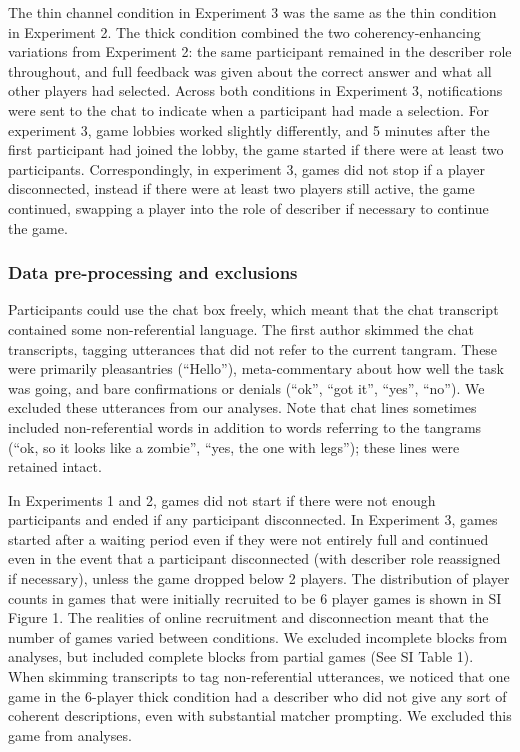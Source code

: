 \documentclass[
  english,
]{article}
\begin{document}
The thin channel condition in Experiment 3 was the same as the thin condition in Experiment 2.
The thick condition combined the two coherency-enhancing variations from Experiment 2: the same participant remained in the describer role throughout, and full feedback was given about the correct answer and what all other players had selected.
Across both conditions in Experiment 3, notifications were sent to the chat to indicate when a participant had made a selection.
For experiment 3, game lobbies worked slightly differently, and 5 minutes after the first participant had joined the lobby, the game started if there were at least two participants. Correspondingly, in experiment 3, games did not stop if a player disconnected, instead if there were at least two players still active, the game continued, swapping a player into the role of describer if necessary to continue the game.

\hypertarget{data-pre-processing-and-exclusions}{%
\subsubsection{Data pre-processing and exclusions}\label{data-pre-processing-and-exclusions}}

Participants could use the chat box freely, which meant that the chat transcript contained some non-referential language. The first author skimmed the chat transcripts, tagging utterances that did not refer to the current tangram. These were primarily pleasantries (``Hello''), meta-commentary about how well the task was going, and bare confirmations or denials (``ok'', ``got it'', ``yes'', ``no''). We excluded these utterances from our analyses. Note that chat lines sometimes included non-referential words in addition to words referring to the tangrams (``ok, so it looks like a zombie'', ``yes, the one with legs''); these lines were retained intact.

In Experiments 1 and 2, games did not start if there were not enough participants and ended if any participant disconnected.
In Experiment 3, games started after a waiting period even if they were not entirely full and continued even in the event that a participant disconnected (with describer role reassigned if necessary), unless the game dropped below 2 players.
The distribution of player counts in games that were initially recruited to be 6 player games is shown in SI Figure 1.
The realities of online recruitment and disconnection meant that the number of games varied between conditions.
We excluded incomplete blocks from analyses, but included complete blocks from partial games (See SI Table 1).
When skimming transcripts to tag non-referential utterances, we noticed that one game in the 6-player thick condition had a describer who did not give any sort of coherent descriptions, even with substantial matcher prompting. We excluded this game from analyses.
\end{document}
